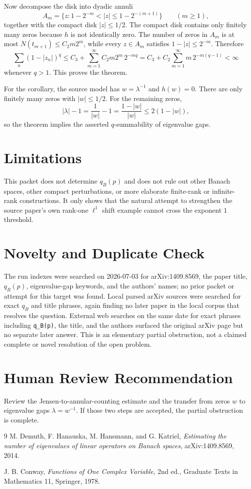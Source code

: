 \documentclass[11pt]{article}
\begin{document}
Now decompose the disk into dyadic annuli
\[
  A_m=\{z:1-2^{-m}<|z|\le 1-2^{-(m+1)}\}\qquad(m\ge1),
\]
together with the compact disk $|z|\le1/2$.  The compact disk contains only
finitely many zeros because $h$ is not identically zero.  The number of zeros
in $A_m$ is at most $N(t_{m+1})\le C_2 m2^m$, while every $z\in A_m$
satisfies $1-|z|\le2^{-m}$.  Therefore
\[
  \sum_n(1-|z_n|)^q
  \le C_3+\sum_{m=1}^{\infty} C_2 m2^m\,2^{-mq}
  = C_3+C_2\sum_{m=1}^{\infty}m\,2^{-m(q-1)}<\infty
\]
whenever $q>1$.  This proves the theorem.

For the corollary, the source model has $w=\lambda^{-1}$ and $h(w)=0$.
There are only finitely many zeros with $|w|\le1/2$.  For the remaining
zeros,
\[
  |\lambda|-1=\frac1{|w|}-1=\frac{1-|w|}{|w|}\le2(1-|w|),
\]
so the theorem implies the asserted $q$-summability of eigenvalue gaps.

\section*{Limitations}

This packet does not determine $q_B(p)$ and does not rule out other Banach
spaces, other compact perturbations, or more elaborate finite-rank or
infinite-rank constructions.  It only shows that the natural attempt to
strengthen the source paper's own rank-one $\ell^1$ shift example cannot
cross the exponent $1$ threshold.

\section*{Novelty and Duplicate Check}

The run indexes were searched on 2026-07-03 for arXiv:1409.8569, the paper
title, $q_B(p)$, eigenvalue-gap keywords, and the authors' names; no prior
packet or attempt for this target was found.  Local parsed arXiv sources were
searched for exact $q_B$ and title phrases, again finding no later paper in
the local corpus that resolves the question.  External web searches on the
same date for exact phrases including \texttt{q\_B(p)}, the title, and the
authors surfaced the original arXiv page but no separate later answer.  This
is an elementary partial obstruction, not a claimed complete or novel
resolution of the open problem.

\section*{Human Review Recommendation}

Review the Jensen-to-annular-counting estimate and the transfer from zeros
$w$ to eigenvalue gaps $\lambda=w^{-1}$.  If those two steps are accepted,
the partial obstruction is complete.

\begin{thebibliography}{9}
M. Demuth, F. Hanauska, M. Hansmann, and G. Katriel,
\emph{Estimating the number of eigenvalues of linear operators on Banach
spaces}, arXiv:1409.8569, 2014.

J. B. Conway,
\emph{Functions of One Complex Variable},
2nd ed., Graduate Texts in Mathematics 11, Springer, 1978.
\end{thebibliography}
\end{document}
